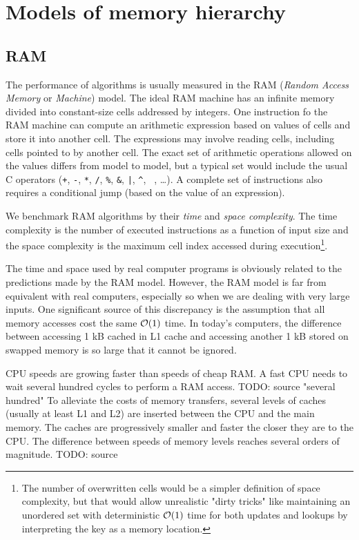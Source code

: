 \chapter{Models of memory hierarchy}
\section{RAM}

The performance of algorithms is usually measured in the RAM
(\textit{Random Access Memory} or \textit{Machine}) model.
The ideal RAM machine has an infinite memory divided into constant-size
cells addressed by integers.
One instruction fo the RAM machine can compute an arithmetic expression
based on values of cells and store it into another cell. The expressions
may involve reading cells, including cells pointed to by another cell.
The exact set of arithmetic operations allowed on the values differs
from model to model, but a typical set would include the usual C operators
(\texttt{+}, \texttt{-}, \texttt{*}, \texttt{/}, \texttt{\%}, \texttt{\&},
 \texttt{|}, \texttt{\^}, \texttt{~}, \dots).
A complete set of instructions also requires a conditional jump (based on
the value of an expression).

We benchmark RAM algorithms by their \textit{time} and \textit{space complexity}.
The time complexity is the number of executed instructions as a function of
input size and the space complexity is the maximum cell index accessed during
execution\footnote{
	The number of overwritten cells would be a simpler definition
	of space complexity, but that would allow unrealistic "dirty tricks"
	like maintaining an unordered set with deterministic $\mathcal{O}(1)$ time
	for both updates and lookups by interpreting the key as a memory
	location.
}.

The time and space used by real computer programs is obviously related
to the predictions made by the RAM model. However, the RAM model is far
from equivalent with real computers, especially so when we are dealing with
very large inputs. One significant source of this discrepancy is the assumption
that all memory accesses cost the same $\mathcal{O}(1)$ time. In today's computers,
the difference between accessing 1 kB cached in L1 cache and accessing
another 1 kB stored on swapped memory is so large that it cannot be ignored.


CPU speeds are growing faster than speeds of cheap RAM. A fast CPU needs to
wait several hundred cycles to perform a RAM access. TODO: source "several hundred"
To alleviate the costs of memory transfers, several levels of caches (usually
at least L1 and L2) are inserted between the CPU and the main memory.
The caches are progressively smaller and faster the closer they are to the CPU.
The difference between speeds of memory levels reaches several orders of magnitude. TODO: source


